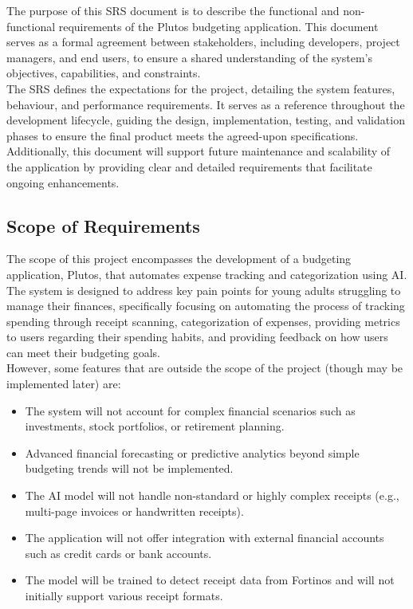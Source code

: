 \documentclass[12pt]{article}
\begin{document}
The purpose of this SRS document is to describe the functional and non-functional requirements of the Plutos budgeting application. This document serves as a formal agreement between stakeholders, including developers, project managers, and end users, to ensure a shared understanding of the system's objectives, capabilities, and constraints. \\

\noindent The SRS defines the expectations for the project, detailing the system features, behaviour, and performance requirements. It serves as a reference throughout the development lifecycle, guiding the design, implementation, testing, and validation phases to ensure the final product meets the agreed-upon specifications. Additionally, this document will support future maintenance and scalability of the application by providing clear and detailed requirements that facilitate ongoing enhancements.

\subsection{Scope of Requirements} 

The scope of this project encompasses the development of a budgeting application, Plutos, that automates expense tracking 
and categorization using AI. The system is designed to address key pain points for young adults struggling to manage their 
finances, specifically focusing on automating the process of tracking spending through receipt scanning, categorization of 
expenses, providing metrics to users regarding their spending habits, and providing feedback on how users can meet their 
budgeting goals.\\

\noindent However, some features that are outside the scope of the project (though may be implemented later) are: 

\begin{itemize}
  \item The system will not account for complex financial scenarios such as investments, stock portfolios, or retirement planning.
  \item Advanced financial forecasting or predictive analytics beyond simple budgeting trends will not be implemented.
  \item The AI model will not handle non-standard or highly complex receipts (e.g., multi-page invoices or handwritten receipts).
  \item The application will not offer integration with external financial accounts such as credit cards or bank accounts.
  \item The model will be trained to detect receipt data from Fortinos and will not initially support various receipt formats.
\end{itemize}
\end{document}
